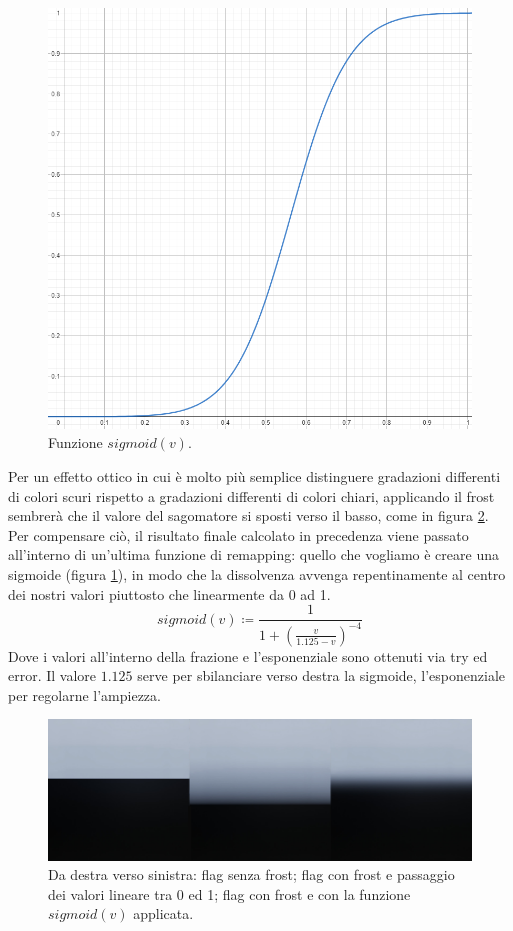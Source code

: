 \documentclass[main.tex]{subfiles}
\begin{document}
\begin{figure}
    \centering
    \captionsetup{justification=centering}
    \includegraphics[scale=0.35]{img/newFeatures/sCurve.png}
    \caption{Funzione $sigmoid(v)$.}
    \label{fig:5_sCurve}
\end{figure}
Per un effetto ottico in cui è molto più semplice distinguere gradazioni differenti di colori scuri rispetto a gradazioni differenti di colori chiari, applicando il frost sembrerà che il valore del sagomatore si sposti verso il basso, come in figura \ref{fig:5_shaperFixes}. Per compensare ciò, il risultato finale calcolato in precedenza viene passato all'interno di un'ultima funzione di remapping: quello che vogliamo è creare una sigmoide (figura \ref{fig:5_sCurve}), in modo che la dissolvenza avvenga repentinamente al centro dei nostri valori piuttosto che linearmente da 0 ad 1.
\[sigmoid(v) \coloneqq \frac{1}{1 + (\frac{v}{1.125 - v})^{-4}}\]
Dove i valori all'interno della frazione e l'esponenziale sono ottenuti via try ed error. Il valore $1.125$ serve per sbilanciare verso destra la sigmoide, l'esponenziale per regolarne l'ampiezza.
\begin{figure}[H]
    \centering
    \includegraphics[width=1\linewidth]{img/newFeatures/shaperFixes.jpg}
    \caption{Da destra verso sinistra: flag senza frost; flag con frost e passaggio dei valori lineare tra 0 ed 1; flag con frost e con la funzione $sigmoid(v)$ applicata.}
    \label{fig:5_shaperFixes}
\end{figure}
\end{document}
